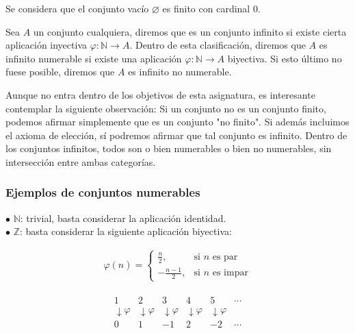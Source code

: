 \documentclass[12pt,a4paper]{article}
\newcommand{\N}{\mathbb{N}}
\newcommand{\Z}{\mathbb{Z}}
\newcounter{unit}[section]
\renewcommand{\theunit}{\arabic{unit}}
\renewcommand{\thesubsubsection}{\theunit.\arabic{subsubsection}}
\newcommand{\result}[1]{%
  \subsubsection{#1}%
  \label{subsubsection:\thesubsubsection}%
}
\begin{document}
\noindent Se considera que el conjunto vacío $\varnothing$ es finito con cardinal $0$.

\vspace{4mm}

Sea $A$ un conjunto cualquiera, diremos que es un conjunto infinito si existe cierta aplicación inyectiva $\varphi : \N \to A$. Dentro de esta clasificación, diremos que $A$ es infinito numerable si existe una aplicación $\varphi : \N \to A$ biyectiva. Si esto último no fuese posible, diremos que $A$ es infinito no numerable.

\vspace{4mm}

Aunque no entra dentro de los objetivos de esta asignatura, es interesante contemplar la siguiente observación: Si un conjunto no es un conjunto finito, podemos afirmar simplemente que es un conjunto "no finito". Si además incluimos el axioma de elección, sí podremos afirmar que tal conjunto es infinito. Dentro de los conjuntos infinitos, todos son o bien numerables o bien no numerables, sin intersección entre ambas categorías.

\vspace{4mm}

\result{Ejemplos de conjuntos numerables}

$\bullet$ $\N$: trivial, basta considerar la aplicación identidad. \\

\noindent
$\bullet$ $\Z$: basta considerar la siguiente aplicación biyectiva:

\begin{minipage}{0.5\textwidth}
\begin{align*}
\varphi(n) =
\begin{cases}
\frac{n}{2}, & \text{si } n \text{ es par} \\
-\frac{n-1}{2}, & \text{si } n \text{ es impar}
\end{cases}
\end{align*}
\end{minipage}%
\begin{minipage}{0.5\textwidth}
\begin{align*}
\begin{array}{cccccc}
1 & 2 & 3 & 4 & 5 & \cdots \\
\downarrow\!\varphi & \downarrow\!\varphi & \downarrow\!\varphi & \downarrow\!\varphi & \downarrow\!\varphi & \\
0 & 1 & -1 & 2 & -2 & \cdots
\end{array}
\end{align*}
\end{minipage}
\end{document}
